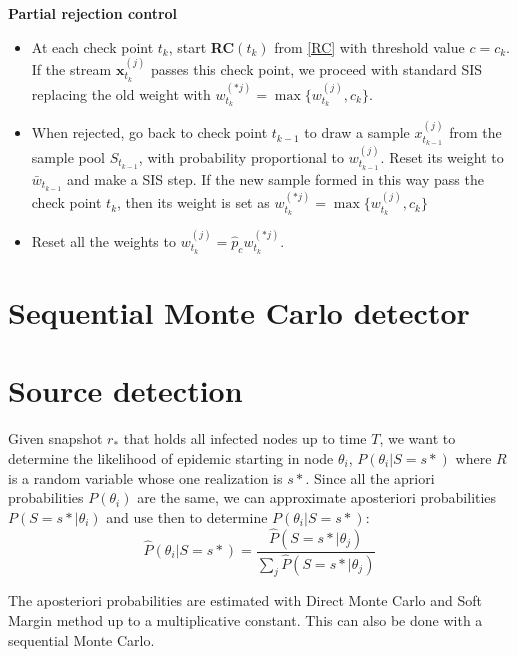 \documentclass[times, utf8, diplomski]{fer}
\begin{document}
\textbf{Partial rejection control}
\begin{itemize}
\item{At each check point $t_k$, start \textbf{RC}$(t_k)$ from \ref{RC} with threshold value $c=c_k$. If the stream $\mathbf{x}_{t_k}^{(j)}$ passes this check point, we proceed with standard SIS replacing the old weight with $w_{t_k}^{(*j)} = \max \{w_{t_k}^{(j)}, c_k\}$.}
\item{When rejected, go back to check point $t_{k - 1}$ to draw a sample $x_{t_{k - 1}}^{(j)}$ from the sample pool $S_{t_{k - 1}}$, with probability proportional to $w_{t_{k - 1}}^{(j)}$. Reset its weight to $\bar{w}_{t_{k - 1}}$ and make a SIS step. If the new sample formed in this way pass the check point $t_k$, then its weight is set as $w_{t_k}^{(*j)} = \max \{w_{t_k}^{(j)}, c_k \} $}
\item{Reset all the weights to $w_{t_k}^{(j)} = \hat{p}_c w_{t_k}^{(*j)}$.}
\end{itemize}


 
\section{Sequential Monte Carlo detector}

\section{Source detection}
Given snapshot $r_*$ that holds all infected nodes up to time $T$, we want to determine the likelihood of epidemic starting in node $\theta_i$, $P(\theta_i | S = s*)$ where $R$ is a random variable whose one realization is $s*$.   Since all the apriori probabilities $P(\theta_i)$ are the same, we can approximate aposteriori probabilities $P(S = s* | \theta_i)$ and use then to determine $P(\theta_i | S = s*)$:
\begin{equation*}
\hat{P}(\theta_i | S = s*) = \frac{\hat{P}(S = s* | \theta_j)}{\sum_j \hat{P}(S = s* | \theta_j)}
\end{equation*}

The aposteriori probabilities are estimated with Direct Monte Carlo and Soft Margin method up to a multiplicative constant. This can also be done with a sequential Monte Carlo.
\end{document}
